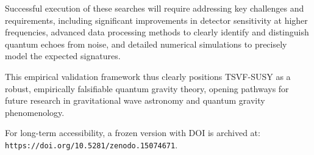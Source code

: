 \documentclass[twocolumn,superscriptaddress,floatfix]{revtex4-2}
\begin{document}
Successful execution of these searches will require addressing key challenges and requirements, including significant improvements in detector sensitivity at higher frequencies, advanced data processing methods to clearly identify and distinguish quantum echoes from noise, and detailed numerical simulations to precisely model the expected signatures.

This empirical validation framework thus clearly positions TSVF-SUSY as a robust, empirically falsifiable quantum gravity theory, opening pathways for future research in gravitational wave astronomy and quantum gravity phenomenology.

For long-term accessibility, a frozen version with DOI is archived at:  
\texttt{https://doi.org/10.5281/zenodo.15074671}.



\end{document}
